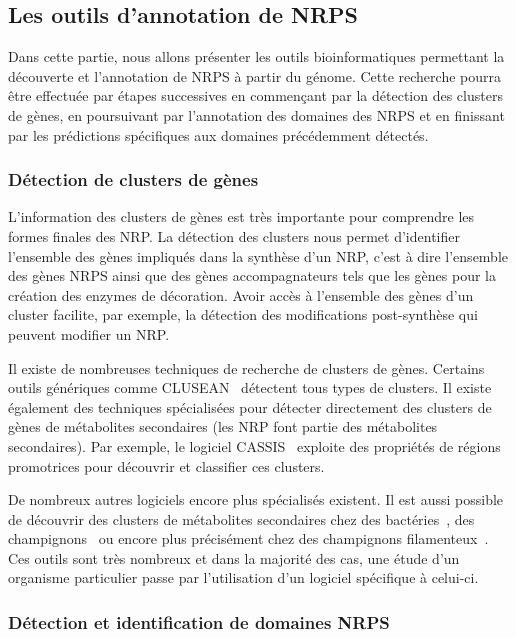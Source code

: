 \subsection{Les outils d'annotation de NRPS}

Dans cette partie, nous allons présenter les outils bioinformatiques permettant la découverte et l'annotation de NRPS à partir du génome.
Cette recherche pourra être effectuée par étapes successives en commençant par la détection des clusters de gènes, en poursuivant par l'annotation des domaines des NRPS et en finissant par les prédictions spécifiques aux domaines précédemment détectés.

\subsubsection{Détection de clusters de gènes}

L'information des clusters de gènes est très importante pour comprendre les formes finales des NRP.
La détection des clusters nous permet d'identifier l'ensemble des gènes impliqués dans la synthèse d'un NRP, c'est à dire l'ensemble des gènes NRPS ainsi que des gènes accompagnateurs tels que les gènes pour la création des enzymes de décoration.
Avoir accès à l'ensemble des gènes d'un cluster facilite, par exemple, la détection des modifications post-synthèse qui peuvent modifier un NRP.

Il existe de nombreuses techniques de recherche de clusters de gènes.
Certains outils génériques comme CLUSEAN~\cite{weber_clusean:_2009} détectent tous types de clusters.
Il existe également des techniques spécialisées pour détecter directement des clusters de gènes de métabolites secondaires (les NRP font partie des métabolites secondaires).
Par exemple, le logiciel CASSIS~\cite{wolf_cassis_2016} exploite des propriétés de régions promotrices pour découvrir et classifier ces clusters.

De nombreux autres logiciels encore plus spécialisés existent.
Il est aussi possible de découvrir des clusters de métabolites secondaires chez des bactéries~\cite{cruz-morales_recapitulation_2015}, des champignons~\cite{khaldi_smurf:_2010} ou encore plus précisément chez des champignons filamenteux~\cite{andersen_accurate_2013,umemura_motif-independent_2015}.
Ces outils sont très nombreux et dans la majorité des cas, une étude d'un organisme particulier passe par l'utilisation d'un logiciel spécifique à celui-ci.


\subsubsection{Détection et identification de domaines NRPS}

